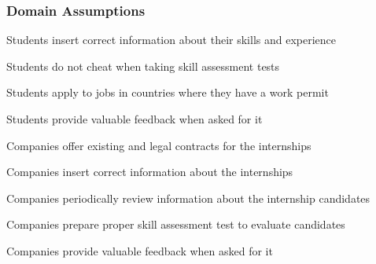 
\subsubsection{Domain Assumptions}
    \begin{enumerate}[label={[D\arabic*]}]
        \item {Students insert correct information about their skills and experience}
        \item {Students do not cheat when taking skill assessment tests}
        \item {Students apply to jobs in countries where they have a work permit}
        \item {Students provide valuable feedback when asked for it}
        \item {Companies offer existing and legal contracts for the internships}
        \item {Companies insert correct information about the internships}
        \item {Companies periodically review information about the internship candidates}
        \item {Companies prepare proper skill assessment test to evaluate candidates}
        \item {Companies provide valuable feedback when asked for it}
    \end{enumerate}